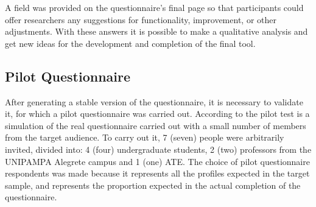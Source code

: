 A field was provided on the questionnaire's final page so that participants could offer researchers any suggestions for functionality, improvement, or other adjustments.
With these answers it is possible to make a qualitative analysis and get new ideas for the development and completion of the final tool.
\subsection{Pilot Questionnaire}\label{sec:survey-pilot}

After generating a stable version of the questionnaire, it is necessary to validate it, for which a pilot questionnaire was carried out.
According to  the pilot test is a simulation of the real questionnaire carried out with a small number of members from the target audience.
To carry out it, 7 (seven) people were arbitrarily invited, divided into: 4 (four) undergraduate students, 2 (two) professors from the \ac{UNIPAMPA} Alegrete campus and 1 (one) \ac{ATE}.
The choice of pilot questionnaire respondents was made because it represents all the profiles expected in the target sample, and represents the proportion expected in the actual completion of the questionnaire.


